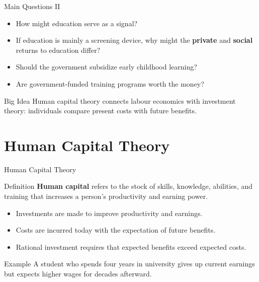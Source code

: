 \documentclass[aspectratio=169]{beamer}
\begin{document}
\begin{frame}{Main Questions II}
\transfade
\begin{itemize}[<+->]
  \item How might education serve as a signal?
  \item If education is mainly a screening device, why might the \textbf{private} and \textbf{social} returns to education differ?
  \item Should the government subsidize early childhood learning?
  \item Are government-funded training programs worth the money?
\end{itemize}

\begin{block}{Big Idea}
Human capital theory connects labour economics with investment theory: individuals compare present costs with future benefits.
\end{block}
\end{frame}

\section{Human Capital Theory}

\begin{frame}{Human Capital Theory}
\transfade
\begin{block}{Definition}
\textbf{Human capital} refers to the stock of skills, knowledge, abilities, and training that increases a person's productivity and earning power.
\end{block}
\begin{itemize}[<+->]
  \item Investments are made to improve productivity and earnings.
  \item Costs are incurred today with the expectation of future benefits.
  \item Rational investment requires that expected benefits exceed expected costs.
\end{itemize}

\begin{exampleblock}{Example}
A student who spends four years in university gives up current earnings but expects higher wages for decades afterward.
\end{exampleblock}
\end{frame}
\end{document}
